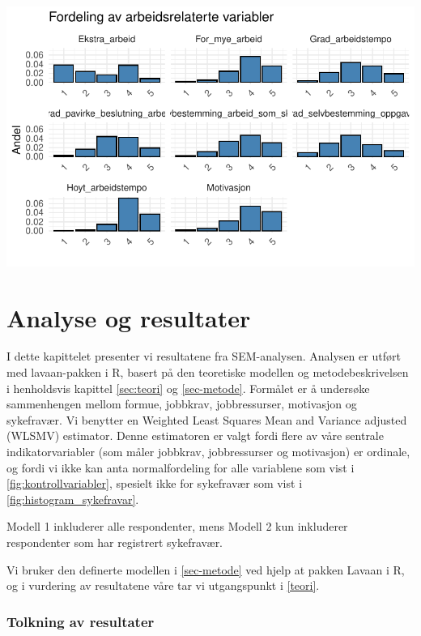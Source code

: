 \documentclass[
  12pt,
  a4paper,
  DIV=11,
  numbers=noendperiod]{scrartcl}
\begin{document}
\includegraphics{kand_SOK2209_Bacheloroppgave_V25_files/figure-pdf/unnamed-chunk-19-1.pdf}

\newpage

\section{Analyse og resultater}\label{sec-analyse}

I dette kapittelet presenter vi resultatene fra SEM-analysen. Analysen
er utført med lavaan-pakken i R, basert på den teoretiske modellen og
metodebeskrivelsen i henholdsvis kapittel \ref{sec:teori} og
\ref{sec-metode}. Formålet er å undersøke sammenhengen mellom formue,
jobbkrav, jobbressurser, motivasjon og sykefravær. Vi benytter en
Weighted Least Squares Mean and Variance adjusted (WLSMV) estimator.
Denne estimatoren er valgt fordi flere av våre sentrale
indikatorvariabler (som måler jobbkrav, jobbressurser og motivasjon) er
ordinale, og fordi vi ikke kan anta normalfordeling for alle variablene
som vist i \autoref{fig:kontrollvariabler}, spesielt ikke for sykefravær
som vist i \autoref{fig:histogram_sykefravar}.

Modell 1 inkluderer alle respondenter, mens Modell 2 kun inkluderer
respondenter som har registrert sykefravær.

Vi bruker den definerte modellen i \ref{sec-metode} ved hjelp at pakken
Lavaan i R, og i vurdering av resultatene våre tar vi utgangspunkt i
\ref{teori}.

\subsubsection{Tolkning av resultater}\label{tolkning-av-resultater}
\end{document}
